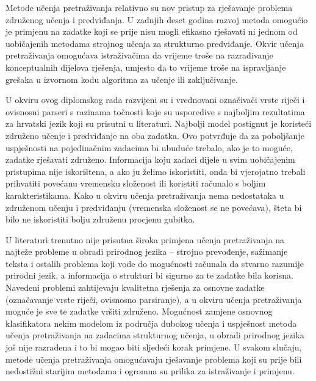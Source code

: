 Metode učenja pretraživanja relativno su nov pristup za rješavanje problema
združenog učenja i predviđanja. U zadnjih deset godina razvoj metoda omogućio je
primjenu na zadatke koji se prije nisu mogli efikasno rješavati ni jednom od
uobičajenih metodama strojnog učenja za strukturno predviđanje. Okvir učenja
pretraživanja omogućava istraživačima da vrijeme troše na razrađivanje
konceptualnih dijelova rješenja, umjesto da to vrijeme troše na ispravljanje
grešaka u izvornom kodu algoritma za učenje ili zaključivanje.

U okviru ovog diplomskog rada razvijeni su i vrednovani označivači vrste riječi
i ovisnosni parseri s razinama točnosti koje su usporedive s najboljim
rezultatima za hrvatski jezik koji su prisutni u literaturi. Najbolji model
postignut je koristeći združeno učenje i predviđanje na oba zadatka. Ovo
potvrđuje da za poboljšanje uspješnosti na pojedinačnim zadacima bi ubuduće
trebalo, ako je to moguće, zadatke rješavati združeno. Informacija koju zadaci
dijele u svim uobičajenim pristupima nije iskorištena, a ako ju želimo
iskoristiti, onda bi vjerojatno trebali prihvatiti povećanu vremensku složenost
ili koristiti računalo s boljim karakteristikama. Kako u okviru učenja
pretraživanja nema nedostataka u združenom učenju i predviđanju (vremenska
složenost se ne povećava), šteta bi bilo ne iskoristiti bolju združenu procjenu
gubitka.

U literaturi trenutno nije prisutna široka primjena učenja pretraživanja na
najteže probleme u obradi prirodnog jezika -- strojno prevođenje, sažimanje
teksta i ostalih problema koji vode do mogućnosti računala da stvarno razumije
prirodni jezik, a informacija o strukturi bi sigurno za te zadatke bila korisna.
Navedeni problemi zahtijevaju kvalitetna rješenja za osnovne zadatke
(označavanje vrste riječi, ovisnosno parsiranje), a u okviru učenja
pretraživanja moguće je sve te zadatke vršiti združeno. Mogućnost zamjene
osnovnog klasifikatora nekim modelom iz područja dubokog učenja  i uspješnost metoda učenja pretraživanja na zadacima strukturnog
učenja, u obradi prirodnog jezika još nije razrađena i to bi mogao biti sljedeći
korak primjene. U svakom slučaju, metode učenja pretraživanja omogućavaju
rješavanje problema koji su prije bili nedostižni starijim metodama i ogromna su
prilika za istraživanje i primjenu.
